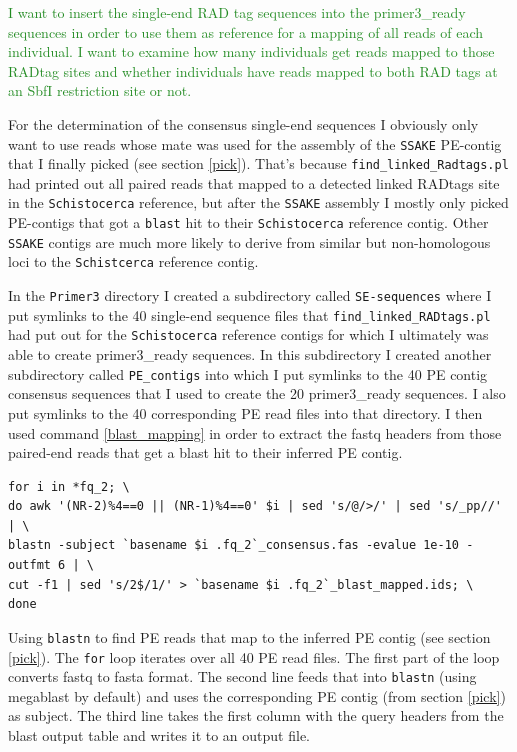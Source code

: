 \documentclass{article}\usepackage[]{graphicx}\usepackage[]{color}
\newcommand{\roger}[1]{ \textcolor[named]{ForestGreen}{#1} }
\begin{document}
\roger{I want to insert the single-end RAD tag sequences into the primer3\_ready sequences in order to use them as reference for a mapping of all reads of each individual. I want to examine how many individuals get reads mapped to those RADtag sites and whether individuals have reads mapped to both RAD tags at an SbfI restriction site or not. }

For the determination of the consensus single-end sequences I obviously only want to use reads whose mate was used for the assembly of the \texttt{SSAKE} PE-contig that I finally picked (see section \ref{pick}). That's because \texttt{find\_linked\_Radtags.pl} had printed out all paired reads that mapped to a detected linked RADtags site in the \texttt{Schistocerca} reference, but after the \texttt{SSAKE} assembly I mostly only picked PE-contigs that got a \texttt{blast} hit to their \texttt{Schistocerca} reference contig. Other \texttt{SSAKE} contigs are much more likely to derive from similar but non-homologous loci to the \texttt{Schistcerca} reference contig.

In the \texttt{Primer3} directory I created a subdirectory called \texttt{SE-sequences} where I put symlinks to the 40 single-end sequence files that \texttt{find\_linked\_RADtags.pl} had put out for the \texttt{Schistocerca} reference contigs for which I ultimately was able to create primer3\_ready sequences. In this subdirectory I created another subdirectory called \texttt{PE\_contigs} into which I put symlinks to the 40 PE contig consensus sequences that I used to create the 20 primer3\_ready sequences. I also put symlinks to the 40 corresponding PE read files into that directory. I then used command \ref{blast_mapping} in order to extract the fastq headers from those paired-end reads that get a blast hit to their inferred PE contig.

\begin{command}
\captionsetup{type=command}
\begin{Verbatim}
for i in *fq_2; \
do awk '(NR-2)%4==0 || (NR-1)%4==0' $i | sed 's/@/>/' | sed 's/_pp//' | \
blastn -subject `basename $i .fq_2`_consensus.fas -evalue 1e-10 -outfmt 6 | \
cut -f1 | sed 's/2$/1/' > `basename $i .fq_2`_blast_mapped.ids; \
done
\end{Verbatim}
\caption{Using \texttt{blastn} to find PE reads that map to the inferred PE contig (see section \ref{pick}). The \texttt{for} loop iterates over all 40 PE read files. The first part of the loop converts fastq to fasta format. The second line feeds that into \texttt{blastn} (using megablast by default) and uses the corresponding PE contig (from section \ref{pick}) as subject. The third line takes the first column with the query headers from the blast output table and writes it to an output file.
}
\label{blast_mapping} 
\end{command}
\end{document}
